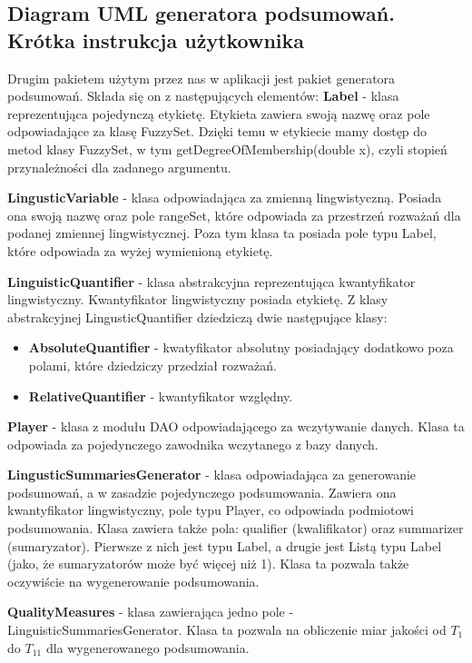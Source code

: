 \documentclass{classrep}
\begin{document}
\subsection{Diagram UML generatora podsumowań. Krótka instrukcja użytkownika} 

Drugim pakietem użytym przez nas w aplikacji jest pakiet generatora podsumowań. Składa się on z następujących elementów:
{\bf Label} - klasa reprezentująca pojedynczą etykietę. Etykieta zawiera swoją nazwę oraz pole odpowiadające za klasę FuzzySet. Dzięki temu w etykiecie mamy dostęp do metod klasy FuzzySet, w tym getDegreeOfMembership(double x), czyli stopień przynależności dla zadanego argumentu.

{\bf LingusticVariable} - klasa odpowiadająca za zmienną lingwistyczną. Posiada ona swoją nazwę oraz pole rangeSet, które odpowiada za przestrzeń rozważań dla podanej zmiennej lingwistycznej. Poza tym klasa ta posiada pole typu Label, które odpowiada za wyżej wymienioną etykietę.

{\bf LinguisticQuantifier} - klasa abstrakcyjna reprezentująca kwantyfikator lingwistyczny. Kwantyfikator lingwistyczny posiada etykietę. Z klasy abstrakcyjnej LingusticQuantifier dziedziczą dwie następujące klasy:
\begin{itemize}
    \item {\bf AbsoluteQuantifier} - kwatyfikator absolutny posiadający dodatkowo poza polami, które dziedziczy przedział rozważań.
    \item {\bf RelativeQuantifier} - kwantyfikator względny.
\end{itemize}

{\bf Player} - klasa z modułu DAO odpowiadającego za wczytywanie danych. Klasa ta odpowiada za pojedynczego zawodnika wczytanego z bazy danych.

{\bf LingusticSummariesGenerator} - klasa odpowiadająca za generowanie podsumowań, a w zasadzie pojedynczego podsumowania. Zawiera ona kwantyfikator lingwistyczny, pole typu Player, co odpowiada podmiotowi podsumowania. Klasa zawiera także pola: qualifier (kwalifikator) oraz summarizer (sumaryzator). Pierwsze z nich jest typu Label, a drugie jest Listą typu Label (jako, że sumaryzatorów może być więcej niż 1). Klasa ta pozwala także oczywiście na wygenerowanie podsumowania.

{\bf QualityMeasures} - klasa zawierająca jedno pole - LinguisticSummariesGenerator. Klasa ta pozwala na obliczenie miar jakości od $T_1$ do $T_{11}$ \cite{niewiadomski19} dla wygenerowanego podsumowania.
\end{document}
